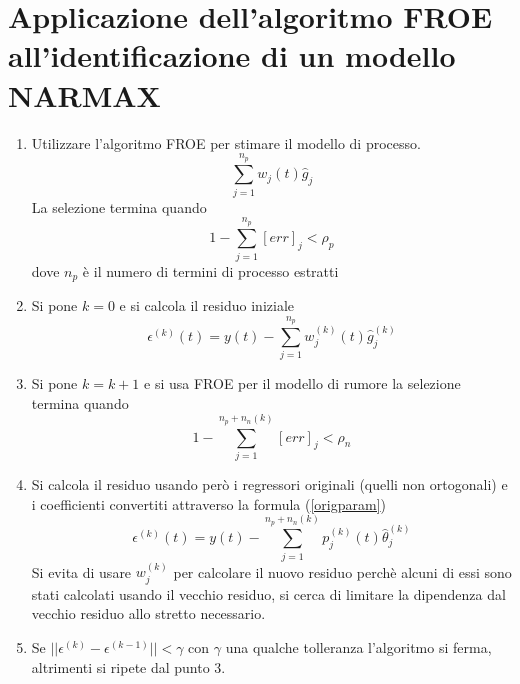 \documentclass[10pt,a4paper]{book}
\begin{document}
\section{Applicazione dell'algoritmo FROE all'identificazione di un modello NARMAX}
\begin{enumerate}
\item Utilizzare l'algoritmo FROE per stimare il modello di processo.
\begin{equation}
\sum^{n_p}_{j=1}w_{j}(t)\hat{g}_{j}
\end{equation}
La selezione termina quando
\begin{equation}
1-\sum^{n_p}_{j=1}[err]_j<\rho_p
\end{equation} 
dove $n_p$ è il numero di termini di processo estratti
\item Si pone $k=0$ e si calcola il residuo iniziale
\begin{equation}
\epsilon^{(k)}(t)=y(t)-\sum^{n_p}_{j=1}w_{j}^{(k)}(t)\hat{g}_{j}^{(k)}
\end{equation}
\item Si pone $k=k+1$ e si usa FROE per il modello di rumore
la selezione termina quando
\begin{equation}
1-\sum^{n_p+n_n(k)}_{j=1}[err]_j<\rho_n
\end{equation} 
\item Si calcola il residuo usando però i regressori originali (quelli non ortogonali) e i coefficienti convertiti attraverso la formula (\ref{origparam})
\begin{equation}
\epsilon^{(k)}(t)=y(t)-\sum^{n_p+n_n(k)}_{j=1}p_{j}^{(k)}(t)\hat{\theta}_{j}^{(k)}
\end{equation}
Si evita di usare $w_{j}^{(k)}$ per calcolare il nuovo residuo perchè alcuni di essi sono stati calcolati usando il vecchio residuo, si cerca di limitare la dipendenza dal vecchio residuo allo stretto necessario.
\item Se $||\epsilon^{(k)}-\epsilon^{(k-1)} ||<\gamma$ con $\gamma$ una qualche tolleranza l'algoritmo si ferma, altrimenti si ripete dal punto 3.
\end{enumerate}
\end{document}
